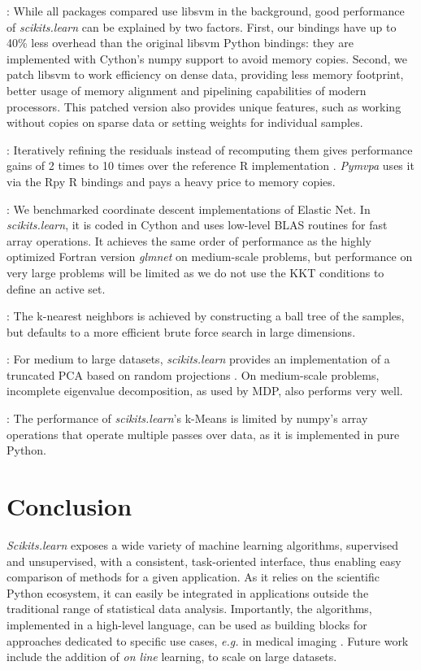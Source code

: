 \documentclass[twoside,11pt]{article}
\begin{document}
\smallskip {}:
%
While all packages compared use libsvm in the background, good
performance of \emph{scikits.learn} can be explained by two factors.
First, our bindings have up to 40\% less overhead than the original
libsvm Python bindings: they are implemented with Cython's numpy support
to avoid memory copies. Second, we patch libsvm to work efficiency
on dense data, providing less memory footprint, better usage of memory
alignment and pipelining capabilities of modern processors. This patched
version also provides unique features, such as working without copies on
sparse data or setting weights for individual samples.


\smallskip {}:
%
Iteratively refining the residuals instead of recomputing them gives
performance gains of 2 times to 10 times over the reference R implementation
\citep{LARS}. {\sl Pymvpa} uses it via the Rpy R
bindings and pays a heavy price to memory copies.


\smallskip {}:
%
We benchmarked coordinate descent implementations of Elastic Net.  In
\emph{scikits.learn}, it is coded in Cython and uses low-level BLAS
routines for fast array operations. It achieves the same order of
performance as the highly optimized Fortran version \emph{glmnet}
\citep{friedman2010} on medium-scale problems, but performance on very
large problems will be limited as we do not use the KKT conditions to
define an active set.

\smallskip
{}:
%
The k-nearest neighbors is achieved by constructing a ball
tree \citep{omohundro1989} of the samples, but defaults to a more
efficient brute force search in large dimensions.

\smallskip {}:
%
For medium to large datasets, \emph{scikits.learn} provides an
implementation of a truncated PCA based on random projections
\citep{rokhlin2009}. On medium-scale problems, incomplete eigenvalue
decomposition, as used by MDP, also performs very well.

\smallskip 
{}:
%
The performance of \emph{scikits.learn}'s k-Means is limited by numpy's
array operations that operate multiple passes over data, as it is
implemented in pure Python.

\section{Conclusion}

\emph{Scikits.learn} exposes a wide variety of machine learning
algorithms, supervised and unsupervised, with a consistent,
task-oriented interface, thus enabling easy comparison of methods for a
given application.
%
As it relies on the scientific Python ecosystem, it can easily be
integrated in applications outside the traditional range of statistical
data analysis. Importantly, the algorithms, implemented in a high-level
language, can be used as building blocks for approaches dedicated to
specific use cases, \emph{e.g.} in medical imaging \citep{Michel2011}.
%
Future work include the addition of \emph{on line} learning, to scale on
large datasets.


\end{document}
